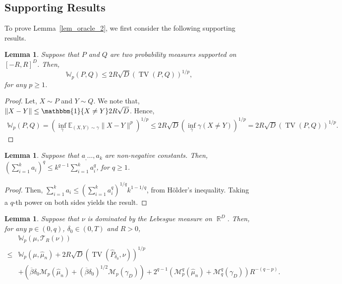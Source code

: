 \documentclass[12pts]{article}
\newtheorem{lemma}[defn]{Lemma}%
\def\Real{\mathop{\mathbb{R}}\nolimits}
\newcommand{\one}{\mathbbm{1}}
\newcommand{\sM}{ \mathscr{M}}
\newcommand{\sT}{ \mathscr{T}}
\newcommand{\hP}{ \hat{P}}
\newcommand{\hmu}{\hat{\mu}}
\newcommand{\E}{\mathbb{E}}
\newcommand{\fW}{\mathbb{W}}
\newcommand{\tv}{\operatorname{TV}}
\begin{document}
\subsection{Supporting Results}
To prove Lemma~\ref{lem_oracle_2}, we first consider the following supporting results.
\begin{lemma}\label{wtvbd}
    Suppose that $P$ and $Q$ are two probability measures supported on $[-R,R]^D$. Then, 
    \[\fW_p(P,Q) \le 2 R \sqrt{D} \left(\operatorname{TV}(P,Q)\right)^{1/p},\]
    for any $p \ge 1$.
\end{lemma}
\begin{proof}
    Let, $X\sim P$ and $Y \sim Q$. We note that, $\|X-Y\| \le \one\{X \neq Y\} 2 R \sqrt{D}$. Hence,
    \begin{align*}
        \fW_p(P,Q) = \left(\inf_\gamma \E_{(X, Y) \sim \gamma} \|X-Y\|^p \right)^{1/p} \le  2R \sqrt{D} \left(\inf_\gamma \gamma(X\neq Y)\right)^{1/p} 
        =  2 R \sqrt{D} \left(\operatorname{TV}(P,Q)\right)^{1/p}.
    \end{align*}
\end{proof}
\begin{lemma}\label{lem_j_3}
    Suppose that $a_, \dots, a_k$ are non-negative constants. Then, $\left(\sum_{i=1}^k a_i\right)^q \le k^{q-1} \sum_{i=1}^k a_i^q $, for $q \ge 1$.
\end{lemma}
\begin{proof}
    Then, $\sum_{i=1}^k a_i \le \left(\sum_{i=1}^k a_i^q \right)^{1/q} k^{1-1/q}$, from H\"older's inequality. Taking a $q$-th power on both sides yields the result.
\end{proof}
\begin{lemma}\label{lem_oracle}
Suppose that $\nu$ is dominated by the Lebesgue measure on $\Real^D$. Then, for any $p \in (0, q)$, $\delta_0 \in (0,T)$ and $R > 0$, 
\begingroup
\allowdisplaybreaks
    \begin{align}
        & \fW_p(\mu, \sT_R(\nu)) \nonumber\\
        \le & \fW_p(\mu, \hmu_n) + 2R\sqrt{D}  \left(\tv(\hP_{\delta_0}, \nu)\right)^{1/p} \nonumber\\
        & +  \left( \overline{\beta}\delta_0 \sM_p(\hmu_n) + (\overline{\beta}\delta_0)^{1/2} \sM_p(\gamma_D) \right) + 2^{q-1} \left( \sM_p^q(\hmu_n) +   \sM_q^q(\gamma_D) \right) R^{-(q-p)}. \label{eq_oracle}
    \end{align}
    \endgroup
\end{lemma}
\end{document}
